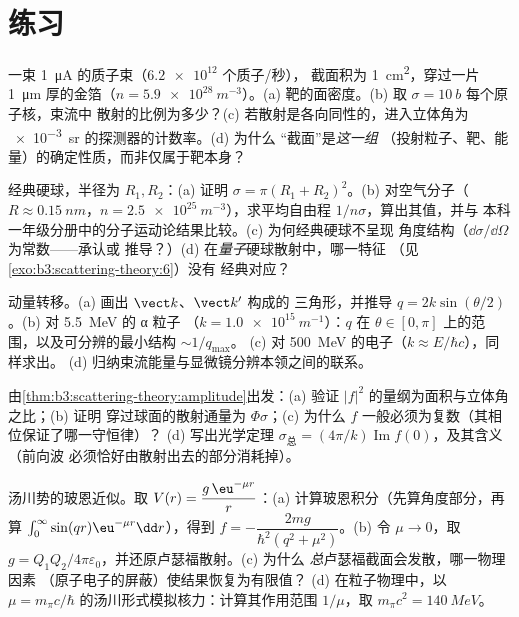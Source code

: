 \section{练习}

\begin{exercise}[$\star$]\label{exo:b3:scattering-theory:1}
一束 \qty{1}{\micro A} 的质子束（$\num{6.2e12}$ 个质子/秒），
截面积为 \qty{1}{cm^2}，穿过一片 \qty{1}{\micro m} 厚的金箔（$n =
\qty{5.9e28}{m^{-3}}$）。(a) 靶的面密度。(b) 取
$\sigma = \qty{10}{b}$ 每个原子核，束流中
散射的比例为多少？(c) 若散射是各向同性的，进入立体角为
\qty{e-3}{sr} 的探测器的计数率。(d) 为什么
“截面”是\emph{这一组}
（投射粒子、靶、能量）的确定性质，而非仅属于靶本身？
\end{exercise}

\begin{exercise}[$\star$]\label{exo:b3:scattering-theory:2}
经典硬球，半径为 $R_1, R_2$：(a) 证明 $\sigma =
\pi(R_1 + R_2)^2$。(b) 对空气分子（$R \approx
\qty{0.15}{nm}$，$n = \qty{2.5e25}{m^{-3}}$），求平均自由程
$1/n\sigma$，算出其值，并与
本科一年级分册中的分子运动论结果比较。(c) 为何经典硬球不呈现
角度结构（$\dd\sigma/\dd\Omega$ 为常数——承认或
推导？）(d) 在\emph{量子}硬球散射中，哪一特征
（见\cref{exo:b3:scattering-theory:6}）没有
经典对应？
\end{exercise}

\begin{exercise}[$\star$]\label{exo:b3:scattering-theory:3}
动量转移。(a) 画出 $\vect k$、$\vect k'$ 构成的
三角形，并推导 $q = 2k\sin(\theta/2)$。(b) 对 \qty{5.5}{MeV} 的 α 粒子
（$k = \qty{1.0e15}{m^{-1}}$）：$q$ 在 $\theta \in
[0, \pi]$ 上的范围，以及可分辨的最小结构 $\sim 1/q_{\max}$。
(c) 对 \qty{500}{MeV} 的电子（$k \approx E/\hbar c$），同样求出。
(d) 归纳束流能量与显微镜分辨本领之间的联系。
\end{exercise}

\begin{exercise}[$\star$]\label{exo:b3:scattering-theory:4}
由\cref{thm:b3:scattering-theory:amplitude}出发：(a) 验证
$|f|^2$ 的量纲为面积与立体角之比；(b) 证明
穿过球面的散射通量为 $\Phi\sigma$；(c) 为什么
$f$ 一般必须为复数（其相位保证了哪一守恒律）？
(d) 写出光学定理 $\sigma_{\text{总}} =
(4\pi/k)\operatorname{Im}f(0)$，及其含义（前向波
必须恰好由散射出去的部分消耗掉）。
\end{exercise}

\begin{exercise}[$\star\star$]\label{exo:b3:scattering-theory:5}
汤川势的玻恩近似。取 $V(r) = \dfrac{g\,\eu^{-\mu r}}{r}$：(a)
计算玻恩积分（先算角度部分，再算 $\int_0^
\infty\sin(qr)\eu^{-\mu r}\dd r$），得到 $f = -\dfrac{2mg}
{\hbar^2(q^2 + \mu^2)}$。(b) 令 $\mu \to 0$，取 $g =
Q_1Q_2/4\pi\varepsilon_0$，并还原卢瑟福散射。(c) 为什么
\emph{总}卢瑟福截面会发散，哪一物理因素
（原子电子的屏蔽）使结果恢复为有限值？
(d) 在粒子物理中，以 $\mu =
m_\pi c/\hbar$ 的汤川形式模拟核力：计算其作用范围
$1/\mu$，取 $m_\pi c^2 = \qty{140}{MeV}$。
\end{exercise}

